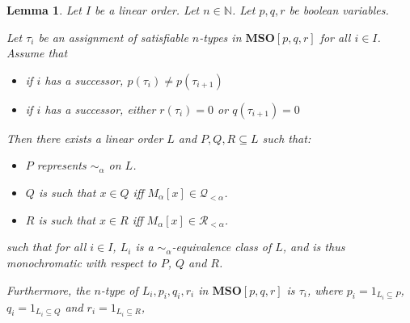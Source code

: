 \documentclass{article}
\newtheorem{lemma}{Lemma}
\newcommand{\mso}{\mathbf{MSO}}
\newcommand{\NN}{\mathbb{N}}
\begin{document}
\begin{lemma}
  Let $I$ be a linear order. Let $n \in \NN$. Let $p, q, r$ be boolean variables.

  Let $\tau_i$ be an assignment of satisfiable $n$-types in $\mso[p, q, r]$ for all $i \in I$. Assume that
  \begin{itemize}
    \item if $i$ has a successor, $p(\tau_i) \ne p(\tau_{i+1})$
    \item if $i$ has a successor, either $r(\tau_i) = 0$ or $q(\tau_{i+1}) = 0$
  \end{itemize}

  Then there exists a linear order $L$ and $P, Q, R \subseteq L$ such that:
  \begin{itemize}
    \item $P$ represents $\sim_{\alpha}$ on $L$.
    \item $Q$ is such that $x \in Q$ iff $M_{\alpha}[x] \in \mathcal{Q}_{< \alpha}$.
    \item $R$ is such that $x \in R$ iff $M_{\alpha}[x] \in \mathcal{R}_{< \alpha}$.
  \end{itemize}

  such that for all $i \in I$, $L_i$ is a $\sim_{\alpha}$-equivalence class of $L$,
  and is thus monochromatic with respect to $P$, $Q$ and $R$.

  Furthermore, the $n$-type of $L_i, p_i, q_i, r_i$ in $\mso[p, q, r]$ is $\tau_i$, where
  $p_i = 1_{L_i \subseteq P}$, $q_i = 1_{L_i \subseteq Q}$ and $r_i = 1_{L_i \subseteq R}$,
\end{lemma}
\end{document}

